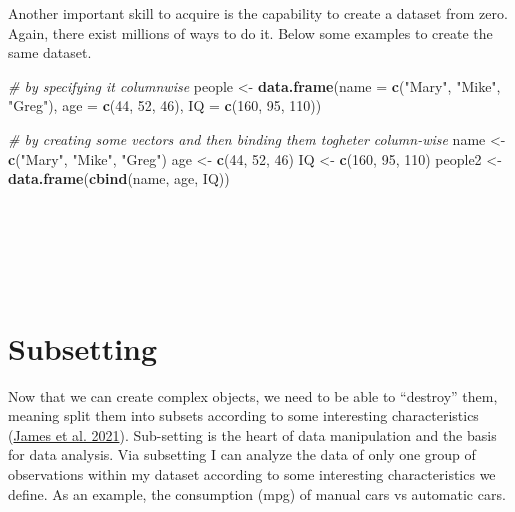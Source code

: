 \documentclass[
]{svmono}
\newenvironment{Shaded}{\begin{snugshade}}{\end{snugshade}}
\newcommand{\AttributeTok}[1]{\textcolor[rgb]{0.13,0.29,0.53}{#1}}
\newcommand{\CommentTok}[1]{\textcolor[rgb]{0.56,0.35,0.01}{\textit{#1}}}
\newcommand{\DecValTok}[1]{\textcolor[rgb]{0.00,0.00,0.81}{#1}}
\newcommand{\FunctionTok}[1]{\textcolor[rgb]{0.13,0.29,0.53}{\textbf{#1}}}
\newcommand{\NormalTok}[1]{#1}
\newcommand{\OtherTok}[1]{\textcolor[rgb]{0.56,0.35,0.01}{#1}}
\newcommand{\StringTok}[1]{\textcolor[rgb]{0.31,0.60,0.02}{#1}}
\begin{document}
Another important skill to acquire is the capability to create a dataset
from zero. Again, there exist millions of ways to do it. Below some
examples to create the same dataset.

\begin{Shaded}
\begin{Highlighting}[]
\CommentTok{\# by specifying it columnwise}
\NormalTok{people }\OtherTok{\textless{}{-}} \FunctionTok{data.frame}\NormalTok{(}\AttributeTok{name =} \FunctionTok{c}\NormalTok{(}\StringTok{"Mary"}\NormalTok{, }\StringTok{"Mike"}\NormalTok{, }\StringTok{"Greg"}\NormalTok{),}
                     \AttributeTok{age =} \FunctionTok{c}\NormalTok{(}\DecValTok{44}\NormalTok{, }\DecValTok{52}\NormalTok{, }\DecValTok{46}\NormalTok{),}
                     \AttributeTok{IQ =} \FunctionTok{c}\NormalTok{(}\DecValTok{160}\NormalTok{, }\DecValTok{95}\NormalTok{, }\DecValTok{110}\NormalTok{))}

\CommentTok{\# by creating some vectors and then binding them togheter column{-}wise}
\NormalTok{name }\OtherTok{\textless{}{-}} \FunctionTok{c}\NormalTok{(}\StringTok{"Mary"}\NormalTok{, }\StringTok{"Mike"}\NormalTok{, }\StringTok{"Greg"}\NormalTok{)}
\NormalTok{age }\OtherTok{\textless{}{-}} \FunctionTok{c}\NormalTok{(}\DecValTok{44}\NormalTok{, }\DecValTok{52}\NormalTok{, }\DecValTok{46}\NormalTok{)}
\NormalTok{IQ }\OtherTok{\textless{}{-}} \FunctionTok{c}\NormalTok{(}\DecValTok{160}\NormalTok{, }\DecValTok{95}\NormalTok{, }\DecValTok{110}\NormalTok{)}
\NormalTok{people2 }\OtherTok{\textless{}{-}} \FunctionTok{data.frame}\NormalTok{(}\FunctionTok{cbind}\NormalTok{(name, age, IQ))}
\end{Highlighting}
\end{Shaded}

~

~

~

\hypertarget{subsetting}{%
\section{Subsetting}\label{subsetting}}

Now that we can create complex objects, we need to be able to ``destroy''
them, meaning split them into subsets according to some interesting
characteristics (\protect\hyperlink{ref-james2021}{James et al. 2021}). Sub-setting is the heart of data
manipulation and the basis for data analysis. Via subsetting I can
analyze the data of only one group of observations within my dataset
according to some interesting characteristics we define. As an example,
the consumption (mpg) of manual cars vs automatic cars.
\end{document}
